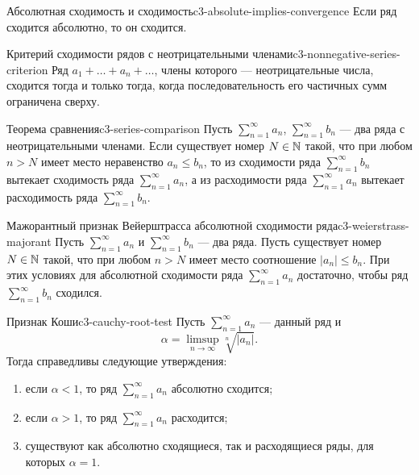 \begin{properties}{Абсолютная сходимость и сходимость}{c3-absolute-implies-convergence}
  Если ряд сходится абсолютно, то он сходится.
\end{properties}

\begin{theorem}{Критерий сходимости рядов с неотрицательными членами}{c3-nonnegative-series-criterion}
  Ряд $a_1+\ldots+a_n+\ldots$, члены которого — неотрицательные числа,
  сходится тогда и только тогда, когда последовательность его частичных
  сумм ограничена сверху.
\end{theorem}

\begin{theorem}{Теорема сравнения}{c3-series-comparison}
  Пусть $\sum\limits_{n=1}^{\infty}a_n$,
  $\sum\limits_{n=1}^{\infty}b_n$ — два ряда с неотрицательными членами.
  Если существует номер $N\in\mathbb{N}$ такой, что при любом $n>N$ имеет место
  неравенство $a_n\le b_n$, то из сходимости ряда
  $\sum\limits_{n=1}^{\infty}b_n$ вытекает сходимость ряда
  $\sum\limits_{n=1}^{\infty}a_n$, а из расходимости ряда
  $\sum\limits_{n=1}^{\infty}a_n$ вытекает расходимость ряда
  $\sum\limits_{n=1}^{\infty}b_n$.
\end{theorem}

\begin{corollary}{Мажорантный признак Вейерштрасса абсолютной сходимости ряда}{c3-weierstrass-majorant}
  Пусть $\sum\limits_{n=1}^{\infty}a_n$ и
  $\sum\limits_{n=1}^{\infty}b_n$ — два ряда. Пусть существует номер
  $N\in\mathbb{N}$ такой, что при любом $n>N$ имеет место соотношение
  $|a_n|\le b_n$. При этих условиях для абсолютной сходимости ряда
  $\sum\limits_{n=1}^{\infty}a_n$ достаточно, чтобы ряд
  $\sum\limits_{n=1}^{\infty}b_n$ сходился.
\end{corollary}

\begin{corollary}{Признак Коши}{c3-cauchy-root-test}
  Пусть $\sum\limits_{n=1}^{\infty}a_n$ — данный ряд и
  \[
    \alpha=\limsup_{n\to\infty}\sqrt[n]{|a_n|}.
  \]
  Тогда справедливы следующие утверждения:
  \begin{enumerate}[label=\alph*)]
    \item если $\alpha<1$, то ряд $\sum\limits_{n=1}^{\infty}a_n$
      абсолютно сходится;
    \item если $\alpha>1$, то ряд $\sum\limits_{n=1}^{\infty}a_n$
      расходится;
    \item существуют как абсолютно сходящиеся, так и расходящиеся ряды,
      для которых $\alpha=1$.
  \end{enumerate}
\end{corollary}

